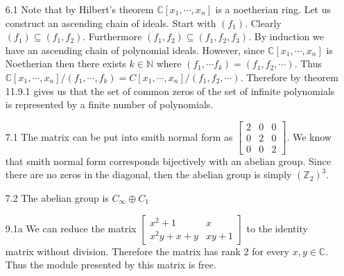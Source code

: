 \documentclass[12pt, letterpaper]{article}
\newcommand{\Z}{\mathbb{Z}}
\newcommand{\N}{\mathbb{N}}
\newcommand{\C}{\mathbb{C}}
\begin{document}
\begin{enumerate}
\begin{itemize}
	\end{itemize}
	\item[6.1] Note that by Hilbert's theorem $\C[x_1,\cdots,x_n]$ is a noetherian
	ring.  Let us construct an ascending chain of ideals.  Start with $(f_1)$.
	Clearly $(f_1) \subseteq (f_1,f_2)$.  Furthermore $(f_1,f_2) \subseteq (f_1,f_2,f_3)$.  By induction we have an ascending chain of polynomial ideals.  
	However, since $\C[x_1,\cdots,x_n]$ is Noetherian then there exists $k \in \N$
	where $(f_1,\cdots f_k) = (f_1,f_2,\cdots)$.  Thus $\C[x_1,\cdots,x_n]/(f_1,\cdots,f_k) = C[x_1,\cdots,x_n]/(f_1,f_2,\cdots)$.  Therefore by theorem 11.9.1
	gives us that the set of common zeros of the set of infinite polynomials 
	is represented by a finite number of polynomials.
	\item[7.1]
	The matrix can be put into smith normal form as $\begin{bmatrix}
	2 & 0 & 0\\ 0 & 2 & 0\\ 0 & 0 & 2\end{bmatrix}	 $.  We know that smith 
	normal form corresponds bijectively with an abelian group.  Since there are no
	zeros in the diagonal, then the abelian group is simply $(\Z_2)^3$.
	\item[7.2] The abelian group is $C_\infty \oplus C_1$
	\item[9.1a] We can reduce the matrix $\begin{bmatrix} x^2+1 & x\\ x^2y + x + y & xy + 1 \end{bmatrix}	 $ to the identity matrix without division.  Therefore 
	the matrix has rank 2 for every $x,y \in \C$.  Thus the module presented by 
	this matrix is free.  
		
\end{enumerate}
\end{document}
